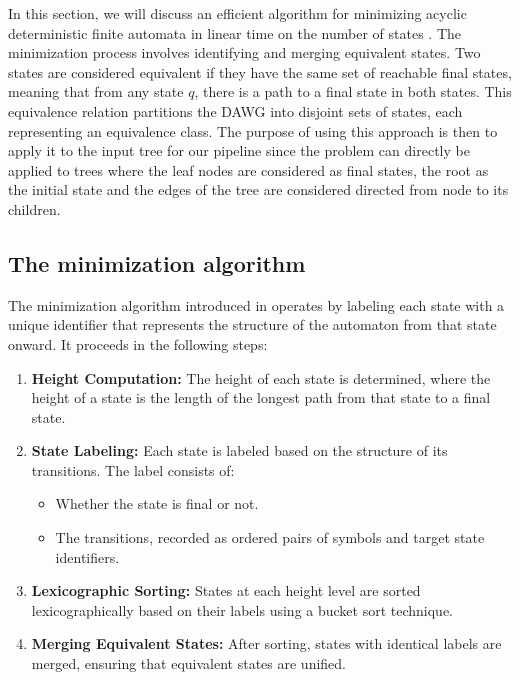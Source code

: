 In this section, we will discuss an efficient algorithm for minimizing acyclic deterministic finite automata in linear time on the number of states \cite{revuz1992minimisation}. The minimization process involves identifying and merging equivalent states. Two states are considered equivalent if they have the same set of reachable final states, meaning that from any state $q$, there is a path to a final state in both states. This equivalence relation partitions the DAWG into disjoint sets of states, each representing an equivalence class. The purpose of using this approach is then to apply it to the input tree for our pipeline since the problem can directly be applied to trees where the leaf nodes are considered as final states, the root as the initial state and the edges of the tree are considered directed from node to its children. 

\subsection{The minimization algorithm}
The minimization algorithm introduced in \cite{revuz1992minimisation} operates by labeling each state with a unique identifier that represents the structure of the automaton from that state onward. It proceeds in the following steps:

\begin{enumerate}
    \item \textbf{Height Computation:} The height of each state is determined, where the height of a state is the length of the longest path from that state to a final state.
    \item \textbf{State Labeling:} Each state is labeled based on the structure of its transitions. The label consists of:
    \begin{itemize}
        \item Whether the state is final or not.
        \item The transitions, recorded as ordered pairs of symbols and target state identifiers.
    \end{itemize}
    \item \textbf{Lexicographic Sorting:} States at each height level are sorted lexicographically based on their labels using a bucket sort technique.
    \item \textbf{Merging Equivalent States:} After sorting, states with identical labels are merged, ensuring that equivalent states are unified.
\end{enumerate}
